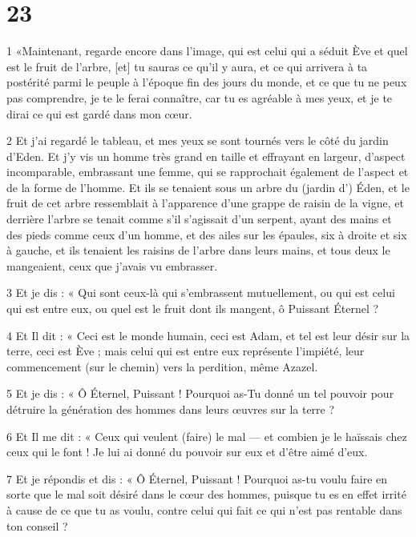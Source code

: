 \chapter{23}

\par 1 «Maintenant, regarde encore dans l'image, qui est celui qui a séduit Ève et quel est le fruit de l'arbre, [et] tu sauras ce qu'il y aura, et ce qui arrivera à ta postérité parmi le peuple à l'époque fin des jours du monde, et ce que tu ne peux pas comprendre, je te le ferai connaître, car tu es agréable à mes yeux, et je te dirai ce qui est gardé dans mon cœur.

\par 2 Et j'ai regardé le tableau, et mes yeux se sont tournés vers le côté du jardin d'Eden. Et j'y vis un homme très grand en taille et effrayant en largeur, d'aspect incomparable, embrassant une femme, qui se rapprochait également de l'aspect et de la forme de l'homme. Et ils se tenaient sous un arbre du (jardin d') Éden, et le fruit de cet arbre ressemblait à l'apparence d'une grappe de raisin de la vigne, et derrière l'arbre se tenait comme s'il s'agissait d'un serpent, ayant des mains et des pieds comme ceux d'un homme, et des ailes sur les épaules, six à droite et six à gauche, et ils tenaient les raisins de l'arbre dans leurs mains, et tous deux le mangeaient, ceux que j'avais vu embrasser.

\par 3 Et je dis : « Qui sont ceux-là qui s'embrassent mutuellement, ou qui est celui qui est entre eux, ou quel est le fruit dont ils mangent, ô Puissant Éternel ?

\par 4 Et Il dit : « Ceci est le monde humain, ceci est Adam, et tel est leur désir sur la terre, ceci est Ève ; mais celui qui est entre eux représente l'impiété, leur commencement (sur le chemin) vers la perdition, même Azazel.

\par 5 Et je dis : « Ô Éternel, Puissant ! Pourquoi as-Tu donné un tel pouvoir pour détruire la génération des hommes dans leurs œuvres sur la terre ?

\par 6 Et Il me dit : « Ceux qui veulent (faire) le mal — et combien je le haïssais chez ceux qui le font ! Je lui ai donné du pouvoir sur eux et d'être aimé d'eux.

\par 7 Et je répondis et dis : « Ô Éternel, Puissant ! Pourquoi as-tu voulu faire en sorte que le mal soit désiré dans le cœur des hommes, puisque tu es en effet irrité à cause de ce que tu as voulu, contre celui qui fait ce qui n'est pas rentable dans ton conseil ?

